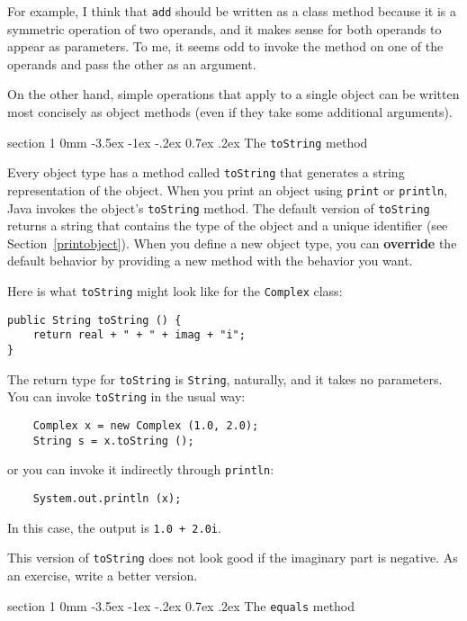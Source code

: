 \documentclass{book}
\makeatletter
\renewcommand{\section}{\@startsection 
    {section} {1} {0mm}%
    {-3.5ex \@plus -1ex \@minus -.2ex}%
    {0.7ex \@plus.2ex}%
    {\normalfont\Large\bfseries}}
\makeatother
\begin{document}
For example, I think that {\tt add} should be written as a class
method because it is a symmetric operation of two operands, and
it makes sense for both operands to appear as parameters.  To me, it
seems odd to invoke the method on one of the operands and pass
the other as an argument.

On the other hand, simple operations that apply to a single object
can be written most concisely as object methods (even if they
take some additional arguments).


\section{The {\tt toString} method}

Every object type has a method called {\tt toString} that generates
a string representation of the object.
When you print an object using {\tt print} or {\tt println},
Java invokes the object's {\tt toString} method.  The default
version of {\tt toString} returns a string that contains the type
of the object and a unique identifier (see Section~\ref{printobject}).
When you define a new object
type, you can {\bf override} the default behavior by providing a
new method with the behavior you want.

Here is what {\tt toString} might look like for the {\tt Complex}
class:

\begin{verbatim}
public String toString () {
    return real + " + " + imag + "i";
}
\end{verbatim}
%
The return type for {\tt toString} is {\tt String}, naturally,
and it takes no parameters.  You can invoke {\tt toString} in
the usual way:

\begin{verbatim}
    Complex x = new Complex (1.0, 2.0);
    String s = x.toString ();
\end{verbatim}
%
or you can invoke it indirectly through {\tt println}:

\begin{verbatim}
    System.out.println (x);
\end{verbatim}
%
In this case, the output is {\tt 1.0 + 2.0i}.

This version of {\tt toString} does not look good if the imaginary
part is negative.  As an exercise, write a better version.


\section{The {\tt equals} method}
\end{document}
